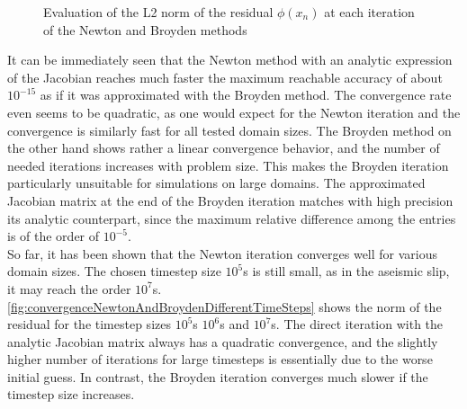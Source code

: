 \begin{figure}[H]
\begin{subfigure}{0.32\textwidth}
	\end{subfigure}
	\caption{Evaluation of the L2 norm of the residual $\phi(x_n)$ at each iteration of the Newton and Broyden methods}
	\label{fig:convergenceNewtonAndBroydenDifferentSizes}
\end{figure}
It can be immediately seen that the Newton method with an analytic expression of the Jacobian reaches much faster the maximum reachable accuracy of about $10^{-15}$ as if it was approximated with the Broyden method. The convergence rate even seems to be quadratic, as one would expect for the Newton iteration and the convergence is similarly fast for all tested domain sizes. The Broyden method on the other hand shows rather a linear convergence behavior, and the number of needed iterations increases with problem size. This makes the Broyden iteration particularly unsuitable for simulations on large domains. The approximated Jacobian matrix at the end of the Broyden iteration matches with high precision its analytic counterpart, since the maximum relative difference among the entries is of the order of $10^{-5}$. \\
So far, it has been shown that the Newton iteration converges well for various domain sizes. The chosen timestep size $10^5$s is still small, as in the aseismic slip, it may reach the order $10^7$s. \autoref{fig:convergenceNewtonAndBroydenDifferentTimeSteps} shows the norm of the residual for the timestep sizes $10^5$s $10^6$s and $10^7$s. The direct iteration with the analytic Jacobian matrix always has a quadratic convergence, and the slightly higher number of iterations for large timesteps is essentially due to the worse initial guess. In contrast, the Broyden iteration converges much slower if the timestep size increases. 
